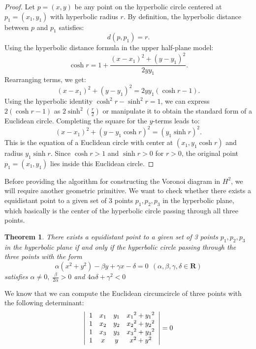 \documentclass[minted, draw]{hebdomon}
\newtheorem{theorem}{Theorem}
\begin{document}
\begin{proof}
    Let $p = (x, y)$ be any point on the hyperbolic circle centered at $p_1 = (x_1, y_1)$ with hyperbolic radius $r$. By definition, the hyperbolic distance between $p$ and $p_1$ satisfies:
    \[
        d(p, p_1) = r.
    \]
    Using the hyperbolic distance formula in the upper half-plane model:
    \[
        \cosh r = 1 + \frac{(x - x_1)^2 + (y - y_1)^2}{2 y y_1}.
    \]
    Rearranging terms, we get:
    \[
        (x - x_1)^2 + (y - y_1)^2 = 2 y y_1 (\cosh r - 1).
    \]
    Using the hyperbolic identity $\cosh^2 r - \sinh^2 r = 1$, we can express $2 (\cosh r - 1)$ as $2 \sinh^2 \left(\frac{r}{2}\right)$ or manipulate it to obtain the standard form of a Euclidean circle. Completing the square for the $y$-terms leads to:
    \[
        (x - x_1)^2 + \left(y - y_1 \cosh r\right)^2 = \left(y_1 \sinh r\right)^2.
    \]
    This is the equation of a Euclidean circle with center at $(x_1, y_1 \cosh r)$ and radius $y_1 \sinh r$. Since $\cosh r > 1$ and $\sinh r > 0$ for $r > 0$, the original point $p_1 = (x_1, y_1)$ lies inside this Euclidean circle.
\end{proof}

Before providing the algorithm for constructing the Voronoi diagram in $H^2$, we will require another geometric primitive. We want to check whether there exists a equidistant point to a given set of 3 points $p_1, p_2, p_3$ in the hyperbolic plane, which basically is the center of the hyperbolic circle passing through all three points.

\begin{theorem}
    There exists a equidistant point to a given set of 3 points $p_1, p_2, p_3$ in the hyperbolic plane if and only if the hyperbolic circle passing through the three points with the form
    \[
    \alpha(x^{2}+y^{2})-\beta y+\gamma x-\delta=0\ \ (\alpha,\beta,\gamma,\delta\in\mathbf{R})
    \]
    satisfies $\alpha\neq0,\;\frac{\beta}{2\alpha} > 0$ and $4\alpha\delta+\gamma^{2}<0$
\end{theorem} 

We know that we can compute the Euclidean circumcircle of three points with the following determinant:
\[
\left|{\begin{array}{c c c c}{1}&{x_{1}}&{y_{1}}&{{x_{1}}^{2}+{y_{1}}^{2}}\\ {1}&{x_{2}}&{y_{2}}&{{x_{2}}^{2}+{y_{2}}^{2}}\\ {1}&{x_{3}}&{y_{3}}&{{x_{3}}^{2}+{y_{3}}^{2}}\\ {1}&{x}&{y}&{{x}^{2}+{y}^{2}}\end{array}}\right|=0
\]
\end{document}
